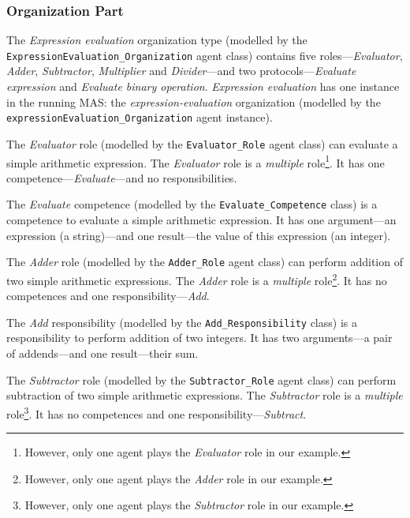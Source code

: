 \subsubsection*{Organization Part}

The \textit{Expression evaluation} organization type (modelled by the \texttt{ExpressionEvaluation\_Organization} agent class) contains five roles---\textit{Evaluator}, \textit{Adder}, \textit{Subtractor}, \textit{Multiplier} and \textit{Divider}---and two protocols---\textit{Evaluate expression} and \textit{Evaluate binary operation}.
\textit{Expression evaluation} has one instance in the running MAS: the \textit{expression-evaluation} organization (modelled by the \texttt{expressionEvaluation\_Organization} agent instance).

The \textit{Evaluator} role (modelled by the \texttt{Evaluator\_Role} agent class) can evaluate a simple arithmetic expression.
The \textit{Evaluator} role is a \textit{multiple} role\footnote{However, only one agent plays the \textit{Evaluator} role in our example.}.
It has one competence---\textit{Evaluate}---and no responsibilities.

The \textit{Evaluate} competence (modelled by the \texttt{Evaluate\_Competence} class) is a competence to evaluate a simple arithmetic expression.
It has one argument---an expression (a string)---and one result---the value of this expression (an integer).

The \textit{Adder} role (modelled by the \texttt{Adder\_Role} agent class) can perform addition of two simple arithmetic expressions.
The \textit{Adder} role is a \textit{multiple} role\footnote{However, only one agent plays the \textit{Adder} role in our example.}.
It has no competences and one responsibility---\textit{Add}.

The \textit{Add} responsibility (modelled by the \texttt{Add\_Responsibility} class) is a responsibility to perform addition of two integers.
It has two arguments---a pair of addends---and one result---their sum.

The \textit{Subtractor} role (modelled by the \texttt{Subtractor\_Role} agent class) can perform subtraction of two simple arithmetic expressions.
The \textit{Subtractor} role is a \textit{multiple} role\footnote{However, only one agent plays the \textit{Subtractor} role in our example.}.
It has no competences and one responsibility---\textit{Subtract}.

